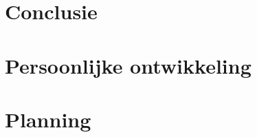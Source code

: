 \documentclass[a4paper,11pt,oneside]{report}
\begin{document}

\chapter{Conclusie}




\appendix
\chapter{Persoonlijke ontwikkeling}
\lipsum[1]

\chapter{Planning}
  \label{chap:planning}


\newpage

\printglossary


\renewcommand{\bibname}{Bronvermeldingen}



\nocite{*}

\end{document}
